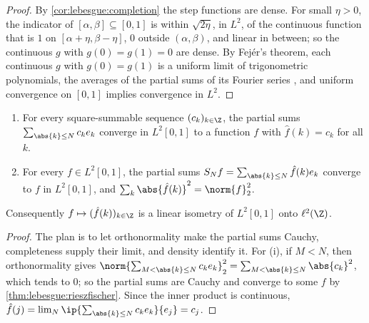 \begin{refsection}

\begin{proof}
By \cref{cor:lebesgue:completion} the step functions are dense. For small $\eta>0$, the indicator of $[\alpha,\beta]\subseteq[0,1]$ is within $\sqrt{2\eta}$, in $L^2$, of the continuous function that is $1$ on $[\alpha+\eta,\beta-\eta]$, $0$ outside $(\alpha,\beta)$, and linear in between; so the continuous $g$ with $g(0)=g(1)=0$ are dense. By Fejér's theorem, each continuous $g$ with $g(0)=g(1)$ is a uniform limit of trigonometric polynomials, the averages of the partial sums of its Fourier series \parencite[Chapter~8]{Folland1999}, and uniform convergence on $[0,1]$ implies convergence in $L^2$.
\end{proof}

\begin{theorem}\label{thm:lebesgue:fourier}
\leavevmode
\begin{enumerate}
\item For every square-summable sequence $(c_k)_{k\in\Z}$, the partial sums $\sum_{\abs{k}\le N}c_ke_k$ converge in $L^2[0,1]$ to a function $f$ with $\hat f(k)=c_k$ for all $k$.
\item For every $f\in L^2[0,1]$, the partial sums $S_Nf=\sum_{\abs{k}\le N}\hat f(k)e_k$ converge to $f$ in $L^2[0,1]$, and $\sum_k\abs{\hat f(k)}^2=\norm{f}_2^2$.
\end{enumerate}
Consequently $f\mapsto(\hat f(k))_{k\in\Z}$ is a linear isometry of $L^2[0,1]$ onto $\ell^2(\Z)$.
\end{theorem}

\begin{proof}
The plan is to let orthonormality make the partial sums Cauchy, completeness supply their limit, and density identify it. For (i), if $M<N$, then orthonormality gives $\norm{\sum_{M<\abs{k}\le N}c_ke_k}_2^2=\sum_{M<\abs{k}\le N}\abs{c_k}^2$, which tends to $0$; so the partial sums are Cauchy and converge to some $f$ by \cref{thm:lebesgue:rieszfischer}. Since the inner product is continuous, $\hat f(j)=\lim_N\ip{\sum_{\abs{k}\le N}c_ke_k}{e_j}=c_j$.


\end{proof}
\end{refsection}
